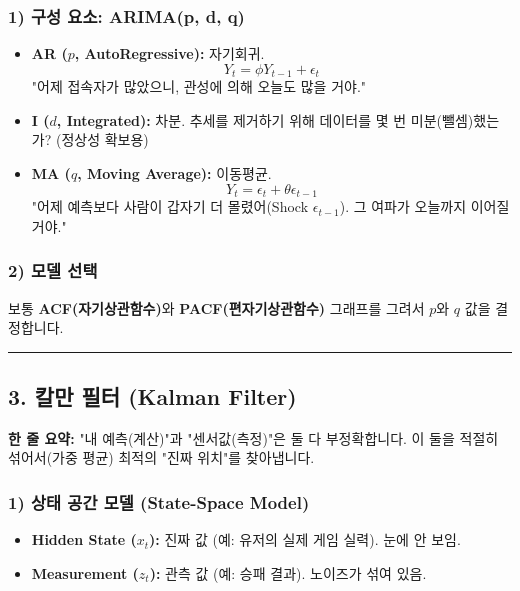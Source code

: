 \documentclass[11pt,a4paper]{book}
\theoremstyle{definition}
\begin{document}
\subsubsection*{1) 구성 요소: ARIMA(p, d, q)}
\begin{itemize}
    \item \textbf{AR ($p$, AutoRegressive):} 자기회귀.
    $$ Y_t = \phi Y_{t-1} + \epsilon_t $$
    "어제 접속자가 많았으니, 관성에 의해 오늘도 많을 거야."
    \item \textbf{I ($d$, Integrated):} 차분.
    추세를 제거하기 위해 데이터를 몇 번 미분(뺄셈)했는가? (정상성 확보용)
    \item \textbf{MA ($q$, Moving Average):} 이동평균.
    $$ Y_t = \epsilon_t + \theta \epsilon_{t-1} $$
    "어제 예측보다 사람이 갑자기 더 몰렸어(Shock $\epsilon_{t-1}$). 그 여파가 오늘까지 이어질 거야."
\end{itemize}

\subsubsection*{2) 모델 선택}
보통 \textbf{ACF(자기상관함수)}와 \textbf{PACF(편자기상관함수)} 그래프를 그려서 $p$와 $q$ 값을 결정합니다.

\vspace{0.5cm}\hrule\vspace{0.5cm}

\subsection{3. 칼만 필터 (Kalman Filter)}


\begin{conceptbox}[title={개념 3: 네비게이션의 원리}]
\textbf{한 줄 요약:} "내 예측(계산)"과 "센서값(측정)"은 둘 다 부정확합니다. 이 둘을 적절히 섞어서(가중 평균) 최적의 "진짜 위치"를 찾아냅니다.
\end{conceptbox}

\subsubsection*{1) 상태 공간 모델 (State-Space Model)}
\begin{itemize}
    \item \textbf{Hidden State ($x_t$):} 진짜 값 (예: 유저의 실제 게임 실력). 눈에 안 보임.
    \item \textbf{Measurement ($z_t$):} 관측 값 (예: 승패 결과). 노이즈가 섞여 있음.
\end{itemize}
\end{document}
